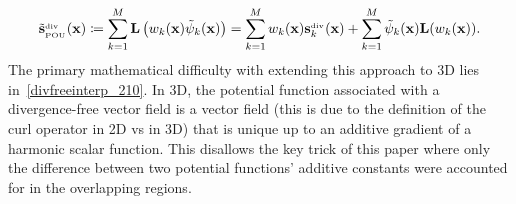 \begin{align}
\tilde{\mathbf{s}}^{_{\text{div}}}_{_{\text{POU}}}(\mathbf{x}) \coloneqq \sum\limits_{k=1}^{M} \mathbf{L} \left(w_k(\mathbf{x}) \tilde{\psi}_k(\mathbf{x})\right) = \sum\limits_{k=1}^{M} w_k(\mathbf{x}) \mathbf{s}_k^{_{\text{div}}}(\mathbf{x}) + \sum\limits_{k=1}^{M} \tilde{\psi}_k(\mathbf{x}) \mathbf{L}(w_k(\mathbf{x})). \label{divfreelocalpou}
\end{align}
%
The primary mathematical difficulty with extending this approach to 3D lies in~\eqref{divfreeinterp_210}. In 3D, the potential function associated with a divergence-free vector field is a vector field (this is due to the definition of the curl operator in 2D vs in 3D) that is unique up to an additive gradient of a harmonic scalar function. This disallows the key trick of this paper where only the difference between two potential functions' additive constants were accounted for in the overlapping regions.


